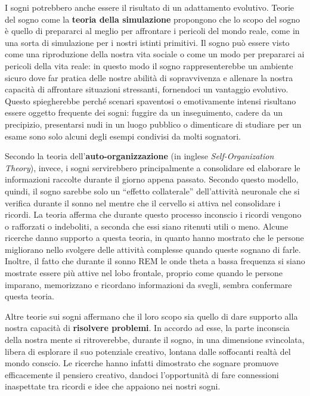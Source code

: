 
I sogni potrebbero anche essere il risultato di un adattamento evolutivo.
Teorie del sogno come la \textbf{teoria della simulazione} propongono che lo scopo del sogno è quello di prepararci
al meglio per affrontare i pericoli del mondo reale, come in una sorta di simulazione per i nostri istinti primitivi.
Il sogno può essere visto come una riproduzione della nostra vita sociale o come un modo per prepararci ai pericoli
della vita reale: in questo modo il sogno rappresenterebbe un ambiente sicuro dove far pratica delle nostre
abilità di sopravvivenza e allenare la nostra capacità di affrontare situazioni stressanti, fornendoci un vantaggio
evolutivo.
Questo spiegherebbe perché scenari spaventosi o emotivamente intensi risultano essere oggetto frequente dei sogni:
fuggire da un inseguimento, cadere da un precipizio, presentarsi nudi in un luogo pubblico o dimenticare di studiare
per un esame sono solo alcuni degli esempi condivisi da molti sognatori.


Secondo la teoria dell'\textbf{auto-organizzazione} (in inglese \textit{Self-Organization Theory}), invece, i sogni
servirebbero principalmente a consolidare ed elaborare le informazioni raccolte durante il giorno appena passato.
Secondo questo modello, quindi, il sogno sarebbe solo un ``effetto collaterale'' dell'attività neuronale
che si verifica durante il sonno nel mentre che il cervello si attiva nel consolidare i ricordi.
La teoria afferma che durante questo processo inconscio i ricordi vengono o rafforzati o indeboliti, a seconda
che essi siano ritenuti utili o meno.
Alcune ricerche danno supporto a questa teoria, in quanto hanno mostrato che le persone migliorano nello svolgere
delle attività complesse quando queste sognano di farle.
Inoltre, il fatto che durante il sonno REM le onde theta a bassa frequenza si siano mostrate essere più attive nel
lobo frontale, proprio come quando le persone imparano, memorizzano e ricordano informazioni da svegli,
sembra confermare questa teoria.


Altre teorie sui sogni affermano che il loro scopo sia quello di dare supporto alla nostra capacità di \textbf{risolvere
problemi}.
In accordo ad esse, la parte inconscia della nostra mente si ritroverebbe, durante il sogno, in una dimensione
svincolata, libera di esplorare il suo potenziale creativo, lontana dalle soffocanti realtà del mondo conscio.
Le ricerche hanno infatti dimostrato che sognare promuove efficacemente il pensiero creativo, dandoci l'opportunità
di fare connessioni inaspettate tra ricordi e idee che appaiono nei nostri sogni.

